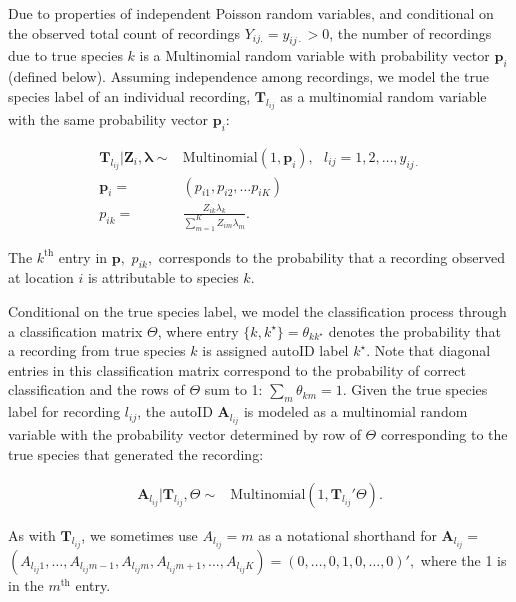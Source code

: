 \documentclass[
]{article}
\begin{document}
Due to properties of independent Poisson random variables, and conditional on the observed total count of recordings \(Y_{ij.} = y_{ij\cdot} > 0\), the number of recordings due to true species \(k\) is a Multinomial random variable with probability vector \(\mathbf{p}_i\) (defined below). Assuming independence among recordings, we model the true species label of an individual recording, \(\mathbf{T}_{l_{ij}}\) as a multinomial random variable with the same probability vector \(\mathbf{p}_i:\)

\begin{align}
    \mathbf{T}_{l_{ij}} \vert \mathbf{Z}_{i}, \boldsymbol{\lambda} \sim& \text{Multinomial}(1, \mathbf{p}_i), \text{ } l_{ij} = 1, 2, \dots, y_{ij\cdot} \label{eqn:T-vec}\\ 
    \nonumber \mathbf{p}_i =& (p_{i1}, p_{i2}, \dots p_{iK})\\ 
    \nonumber p_{ik} =& \frac{Z_{ik}\lambda_{k}}{\sum_{m=1}^K Z_{im}\lambda_m}.
\end{align}

\noindent The \(k^\text{th}\) entry in \(\mathbf{p},\) \(p_{ik},\) corresponds to the probability that a recording observed at location \(i\) is attributable to species \(k\).

Conditional on the true species label, we model the classification process through a classification matrix \(\Theta\), where entry \(\{k, k^\star\} = \theta_{kk^\star}\) denotes the probability that a recording from true species \(k\) is assigned autoID label \(k^\star\). Note that diagonal entries in this classification matrix correspond to the probability of correct classification and the rows of \(\Theta\) sum to 1: \(\sum_{m} \theta_{km} = 1.\) Given the true species label for recording \(l_{ij}\), the autoID \(\mathbf{A}_{l_{ij}}\) is modeled as a multinomial random variable with the probability vector determined by row of \(\Theta\) corresponding to the true species that generated the recording:

\begin{align}
    \mathbf{A}_{l_{ij}} \vert \mathbf{T}_{l_{ij}}, \Theta \sim& \text{Multinomial}(1, \mathbf{T}_{l_{ij}}'\Theta).\label{eqn:A}
\end{align}

\noindent As with \(\mathbf{T}_{l_{ij}}\), we sometimes use \(A_{l_{ij}} = m\) as a notational shorthand for \(\mathbf{A}_{l_{ij}} =\) \newline \((A_{l_{ij}1}, \dots, A_{l_{ij}m-1},A_{l_{ij}m}, A_{l_{ij}m+1}, \dots, A_{l_{ij}K}) = (0, \dots, 0, 1, 0, \dots, 0)',\) where the 1 is in the \(m^{\text{th}}\) entry.
\end{document}
